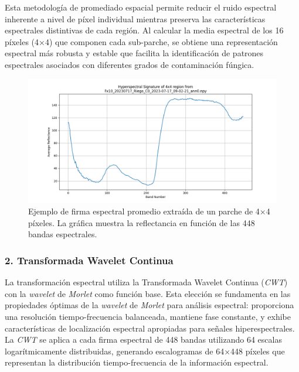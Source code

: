 Esta metodología de promediado espacial permite reducir el ruido espectral inherente a nivel de píxel individual mientras preserva las características espectrales distintivas de cada región. Al calcular la media espectral de los 16 píxeles (4×4) que componen cada sub-parche, se obtiene una representación espectral más robusta y estable que facilita la identificación de patrones espectrales asociados con diferentes grados de contaminación fúngica.

\begin{figure}[ht]
\centering
\includegraphics[width=\textwidth]{images/hyperspectral_signature.png}
\caption{Ejemplo de firma espectral promedio extraída de un parche de 4×4 píxeles. La gráfica muestra la reflectancia en función de las 448 bandas espectrales.}
\label{fig:hyperspectral_signature_example}
\end{figure}

\subsubsection{2. Transformada Wavelet Continua}

La transformación espectral utiliza la Transformada Wavelet Continua (\emph{CWT}) con la \emph{wavelet} de \emph{Morlet} como función base. Esta elección se fundamenta en las propiedades óptimas de la \emph{wavelet} de \emph{Morlet} para análisis espectral: proporciona una resolución tiempo-frecuencia balanceada, mantiene fase constante, y exhibe características de localización espectral apropiadas para señales hiperespectrales. La \emph{CWT} se aplica a cada firma espectral de 448 bandas utilizando 64 escalas logarítmicamente distribuidas, generando escalogramas de 64×448 píxeles que representan la distribución tiempo-frecuencia de la información espectral.

